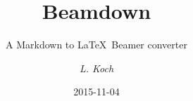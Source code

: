 \title[Beamdown]
      {Beamdown}
\subtitle{A Markdown to \LaTeX\ Beamer converter}
\author[L. Koch]{\emph{L. Koch}}
\date[2015-11-04]{2015-11-04}
\logo{}

\subject{Beamdown, LaTeX, Beamer, Markdown}
